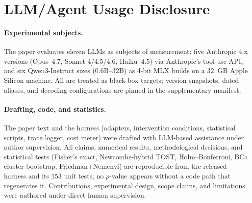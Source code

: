 \section*{LLM/Agent Usage Disclosure}
\label{sec:llm-disclosure}

\paragraph{Experimental subjects.} The paper evaluates eleven LLMs as
subjects of measurement: five Anthropic 4.x versions (Opus~4.7,
Sonnet 4/4.5/4.6, Haiku~4.5) via Anthropic's tool-use API, and six
Qwen3-Instruct sizes (0.6B--32B) as 4-bit MLX builds on a $32$~GB
Apple Silicon machine. All are treated as black-box targets;
version snapshots, dated aliases, and decoding configurations are
pinned in the supplementary manifest.

\paragraph{Drafting, code, and statistics.} The paper text and the
harness (adapters, intervention conditions, statistical scripts,
trace logger, cost meter) were drafted with LLM-based assistance
under author supervision. All claims, numerical results,
methodological decisions, and statistical tests (Fisher's exact,
Newcombe-hybrid TOST, Holm--Bonferroni, BCa cluster-bootstrap,
Friedman+Nemenyi) are reproducible from the released harness and
its $153$ unit tests; no $p$-value appears without a code path that
regenerates it. Contributions, experimental design, scope claims,
and limitations were authored under direct human supervision.
